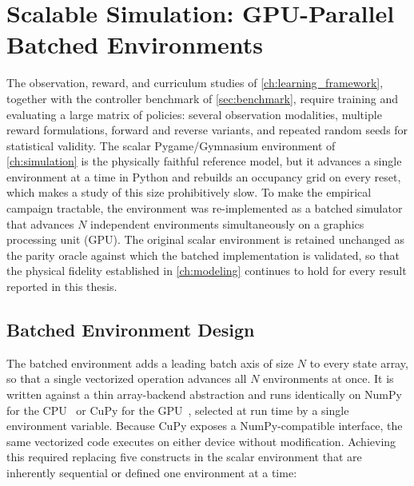 %

\section{Scalable Simulation: GPU-Parallel Batched Environments}
\label{sec:batched_sim}

The observation, reward, and curriculum studies of \cref{ch:learning_framework}, together with the controller benchmark of \cref{sec:benchmark}, require training and evaluating a large matrix of policies: several observation modalities, multiple reward formulations, forward and reverse variants, and repeated random seeds for statistical validity. The scalar Pygame/Gymnasium environment of \cref{ch:simulation} is the physically faithful reference model, but it advances a single environment at a time in Python and rebuilds an occupancy grid on every reset, which makes a study of this size prohibitively slow. To make the empirical campaign tractable, the environment was re-implemented as a batched simulator that advances $N$ independent environments simultaneously on a graphics processing unit (GPU). The original scalar environment is retained unchanged as the parity oracle against which the batched implementation is validated, so that the physical fidelity established in \cref{ch:modeling} continues to hold for every result reported in this thesis.

\subsection{Batched Environment Design}

The batched environment adds a leading batch axis of size $N$ to every state array, so that a single vectorized operation advances all $N$ environments at once. It is written against a thin array-backend abstraction and runs identically on NumPy for the CPU~\cite{harris2020numpy} or CuPy for the GPU~\cite{okuta2017cupy}, selected at run time by a single environment variable. Because CuPy exposes a NumPy-compatible interface, the same vectorized code executes on either device without modification. Achieving this required replacing five constructs in the scalar environment that are inherently sequential or defined one environment at a time:

